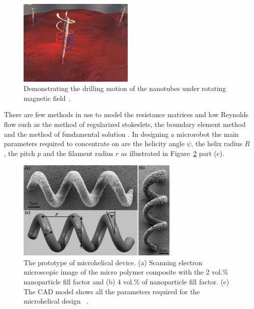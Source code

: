 \documentclass[12pt,a4paper,titlepage]{report}
\begin{document}
\begin{figure}
  \begin{center}
    \includegraphics[width=0.5\textwidth]{nanoJet3}
  \caption[Drilling motion of a nanotube]{Demonstrating the drilling motion of the nanotubes under rotating
 magnetic field~\citep{C2NR32798H}.}
  \label{nanotube}
\end{center}
\end{figure}


There are few methods in use to model the resistance matrices and low Reynolds flow such as the 
method of regularized stokeslets, the boundary element method and the method of fundamental solution
. In designing a microrobot the main parameters required to concentrate on are the helicity angle $\psi$, 
the helix radius $R$, the pitch $p$ and the filament radius $r$ as illustrated in Figure~\ref{ref8} part (c). 

\begin{figure}
  \centering
    \includegraphics[width=0.7\textwidth]{8}
  \caption[The prototype of microhelical device]{ The prototype of microhelical device. (a) Scanning electron microscopic image of the micro polymer composite
with the 2 vol.\% nanoparticle fill factor and (b) 4 vol.\% of nanoparticle fill factor. (c) The CAD model
shows all the parameters required for the microhelical design ~\citep{peyer2013bacteria}.}
  \label{ref8}
\end{figure}
\end{document}
